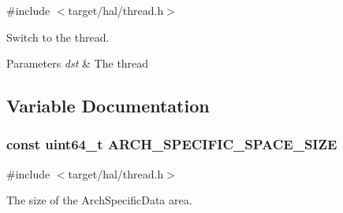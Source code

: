 {\ttfamily \#include $<$target/hal/thread.\+h$>$}



Switch to the thread. 


\begin{DoxyParams}{Parameters}
{\em dst} & The thread \\
\hline
\end{DoxyParams}


\subsection{Variable Documentation}
\subsubsection[{\texorpdfstring{A\+R\+C\+H\+\_\+\+S\+P\+E\+C\+I\+F\+I\+C\+\_\+\+S\+P\+A\+C\+E\+\_\+\+S\+I\+ZE}{ARCH\_SPECIFIC\_SPACE\_SIZE}}]{\setlength{\rightskip}{0pt plus 5cm}const uint64\+\_\+t A\+R\+C\+H\+\_\+\+S\+P\+E\+C\+I\+F\+I\+C\+\_\+\+S\+P\+A\+C\+E\+\_\+\+S\+I\+ZE}\hypertarget{group__threading_gabac505eb1d5a0bf73bf348f98597f080}{}\label{group__threading_gabac505eb1d5a0bf73bf348f98597f080}


{\ttfamily \#include $<$target/hal/thread.\+h$>$}

The size of the Arch\+Specific\+Data area. 